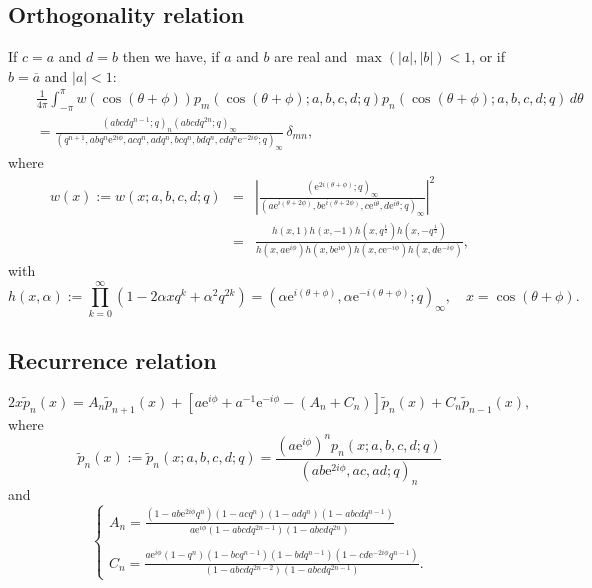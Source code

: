 \documentclass[envcountchap,graybox]{svmono}
\newcommand{\e}{\textrm{e}}
\begin{document}
\subsection*{Orthogonality relation}
If $c=a$ and $d=b$ then we have, if $a$ and $b$ are real and
$\max(|a|,|b|)<1$, or if $b=\overline{a}$ and $|a|<1$:
\begin{eqnarray}
\label{OrtContqHahn}
& &\frac{1}{4\pi}\int_{-\pi}^{\pi}w(\cos(\theta+\phi))
p_m(\cos(\theta+\phi);a,b,c,d;q)p_n(\cos(\theta+\phi);a,b,c,d;q)\,d\theta\nonumber\\
& &{}=\frac{(abcdq^{n-1};q)_n(abcdq^{2n};q)_{\infty}}
{(q^{n+1},abq^n\e^{2i\phi},acq^n,adq^n,bcq^n,bdq^n,cdq^n\e^{-2i\phi};q)_{\infty}}\,\delta_{mn},
\end{eqnarray}
where
\begin{eqnarray*} w(x):=w(x;a,b,c,d;q)&=&\left|\frac{(\e^{2i(\theta+\phi)};q)_{\infty}}
{(a\e^{i(\theta+2\phi)},b\e^{i(\theta+2\phi)},
c\e^{i\theta},d\e^{i\theta};q)_{\infty}}\right|^2\\
&=&\frac{h(x,1)h(x,-1)h(x,q^{\frac{1}{2}})h(x,-q^{\frac{1}{2}})}
{h(x,a\e^{i\phi})h(x,b\e^{i\phi})h(x,c\e^{-i\phi})h(x,d\e^{-i\phi})},
\end{eqnarray*}
with
$$h(x,\alpha):=\prod_{k=0}^{\infty}\left(1-2\alpha xq^k+\alpha^2q^{2k}\right)
=\left(\alpha\e^{i(\theta+\phi)},\alpha\e^{-i(\theta+\phi)};q\right)_{\infty},
\quad x=\cos(\theta+\phi).$$

\subsection*{Recurrence relation}
\begin{equation}
\label{RecContqHahn}
2x{\tilde p}_n(x)=A_n{\tilde p}_{n+1}(x)+\left[a\e^{i\phi}+a^{-1}\e^{-i\phi}-\left(A_n+C_n\right)\right]{\tilde p}_n(x)+C_n{\tilde p}_{n-1}(x),
\end{equation}
where
$${\tilde p}_n(x):={\tilde p}_n(x;a,b,c,d;q)=\frac{(a\e^{i\phi})^np_n(x;a,b,c,d;q)}{(ab\e^{2i\phi},ac,ad;q)_n}$$
and
$$\left\{\begin{array}{l}
\displaystyle A_n=\frac{(1-ab\e^{2i\phi}q^n)(1-acq^n)(1-adq^n)(1-abcdq^{n-1})}{a\e^{i\phi}(1-abcdq^{2n-1})(1-abcdq^{2n})}\\
\\
\displaystyle C_n=\frac{a\e^{i\phi}(1-q^n)(1-bcq^{n-1})(1-bdq^{n-1})(1-cd\e^{-2i\phi}q^{n-1})}{(1-abcdq^{2n-2})(1-abcdq^{2n-1})}.
\end{array}\right.$$

\newpage
\end{document}

